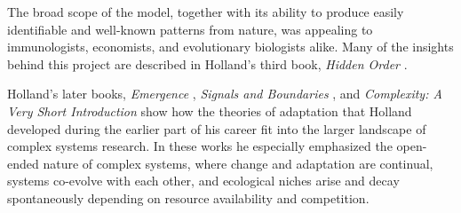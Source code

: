 \documentclass{sig-alternate}
\begin{document}
The broad scope of the model, together with its ability to produce
easily identifiable and well-known patterns from nature, was appealing
to immunologists, economists, and evolutionary biologists alike.  Many
of the insights behind this project are described in Holland's third
book, \emph{Hidden Order} \cite{Holland1995}.  






Holland's later books, \emph{Emergence} \cite{Holland2000},
\emph{Signals and Boundaries} \cite{Holland2012}, and
\emph{Complexity: A Very Short Introduction} \cite{Holland2014} show how the
theories of adaptation that Holland developed during the earlier part
of his career fit into the larger landscape of complex systems
research.  In these works he especially emphasized the open-ended
nature of complex systems, where change and adaptation are
continual, systems co-evolve with each other, and ecological niches arise
and decay spontaneously depending on resource availability and competition.

\end{document}
